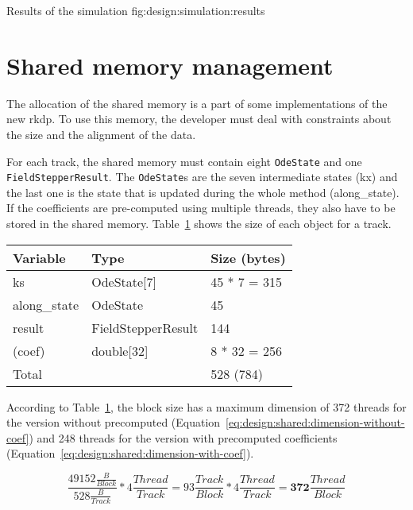         {Results of the simulation}
        {fig:design:simulation:results}


\section{Shared memory management}
\label{ch:design:shared}

The allocation of the shared memory is a part of some implementations of the
new \acrshort{rkdp}.
To use this memory, the developer must deal with constraints about the size and
the alignment of the data.

For each track, the shared memory must contain eight \texttt{OdeState} and one
\texttt{FieldStepperResult}. The \texttt{OdeState}s are the seven intermediate
states (kx) and the last one is the state that is updated during the
whole method (along\_state).
If the coefficients are pre-computed using multiple threads, they also have to be
stored in the shared memory.
Table~\ref{tab:design:shared-component} shows the size of each object for a
track.

\begin{table}[ht]
    \centering
    \begin{tabular}{|l|l|l|}
        \hline
        \textbf{Variable} & \textbf{Type} & \textbf{Size (bytes)} \\
        \hline
        ks & OdeState[7] & 45 * 7 = 315 \\
        \hline
        along\_state & OdeState & 45 \\
        \hline
        result & FieldStepperResult & 144 \\
        \hline
        (coef) & double[32] & 8 * 32 = 256 \\
        \hline
        \multicolumn{2}{|l|}{Total} & 528 (784) \\
        \hline
    \end{tabular}
    \label{tab:design:shared-component}
\end{table}

According to Table~\ref{tab:design:shared-component}, the block size
has a maximum dimension of 372 threads for the version without precomputed (Equation~\ref{eq:design:shared:dimension-without-coef})
and 248 threads for the version with precomputed coefficients (Equation~\ref{eq:design:shared:dimension-with-coef}).

\begin{equation}
    \frac{49152\frac{B}{Block} }{528 \frac{B}{Track} } * 4 \frac{Thread}{Track} = 93\frac{Track}{Block} * 4 \frac{Thread}{Track} = \textbf{372}\frac{Thread}{Block}
    \label{eq:design:shared:dimension-without-coef}
\end{equation}

